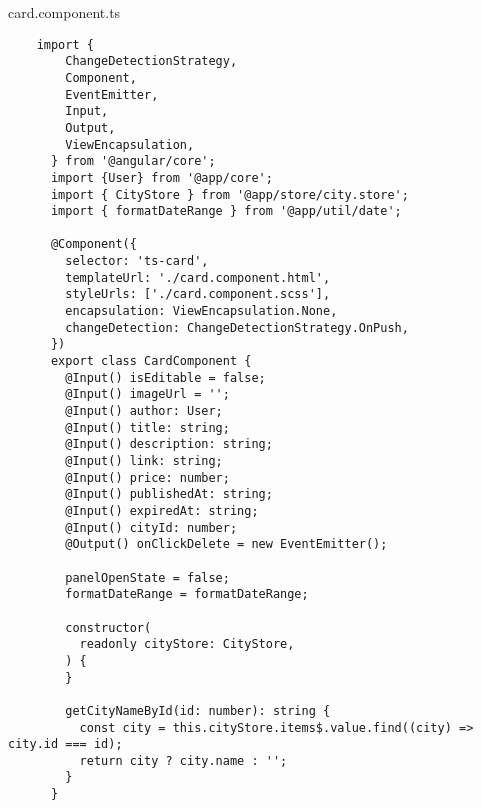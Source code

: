 card.component.ts
\begin{lstlisting}
    import {
        ChangeDetectionStrategy,
        Component,
        EventEmitter,
        Input,
        Output,
        ViewEncapsulation,
      } from '@angular/core';
      import {User} from '@app/core';
      import { CityStore } from '@app/store/city.store';
      import { formatDateRange } from '@app/util/date';
      
      @Component({
        selector: 'ts-card',
        templateUrl: './card.component.html',
        styleUrls: ['./card.component.scss'],
        encapsulation: ViewEncapsulation.None,
        changeDetection: ChangeDetectionStrategy.OnPush,
      })
      export class CardComponent {
        @Input() isEditable = false;
        @Input() imageUrl = '';
        @Input() author: User;
        @Input() title: string;
        @Input() description: string;
        @Input() link: string;
        @Input() price: number;
        @Input() publishedAt: string;
        @Input() expiredAt: string;
        @Input() cityId: number;
        @Output() onClickDelete = new EventEmitter();
      
        panelOpenState = false;
        formatDateRange = formatDateRange;
      
        constructor(
          readonly cityStore: CityStore, 
        ) {
        }
      
        getCityNameById(id: number): string {
          const city = this.cityStore.items$.value.find((city) => city.id === id);
          return city ? city.name : '';
        }
      }      
\end{lstlisting}


\fi
